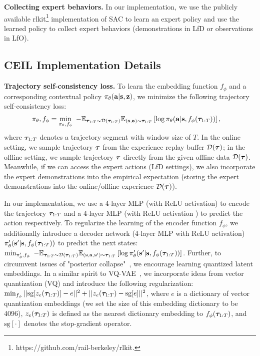 \textbf{Collecting expert behaviors.} In our implementation, we use the publicly available rlkit\footnote{https://github.com/rail-berkeley/rlkit.} implementation of SAC to learn an expert policy and use the learned policy to collect expert behaviors (demonstrations in LfD or observations in LfO). 







\subsection{CEIL Implementation Details}
\label{app:ceil_implementation_details}

\textbf{Trajectory self-consistency loss.} To learn the embedding function ${f_\phi}$ and a corresponding contextual policy $\pi_\theta(\mathbf{a}|\mathbf{s},{\mathbf{z}})$, we minimize the following trajectory self-consistency loss: 
\begin{align}
	\pi_\theta, f_\phi  &= \min_{\pi_\theta, f_\phi} \ - \mathbb{E}_{{\bm{\tau}}_{1:T}\sim\mathcal{D}({\bm{\tau}}_{1:T})}\mathbb{E}_{(\mathbf{s},\mathbf{a})\sim{\bm{\tau}}_{1:T}} \left[ \log \pi_\theta(\mathbf{a}|\mathbf{s}, {f_\phi}({\bm{\tau}}_{1:T})) \right], \nonumber 
\end{align} 
where ${\bm{\tau}}_{1:T}$ denotes a trajectory segment with window size of $T$. In the online setting, we sample trajectory ${\bm{\tau}}$ from the experience replay buffer $\mathcal{D}({\bm{\tau}})$; in the offline setting, we sample trajectory ${\bm{\tau}}$ directly from the given offline data $\mathcal{D}({\bm{\tau}})$. Meanwhile, if we can access the expert actions (\ie LfD settings), we also incorporate the expert demonstrations into the empirical expectation (\ie storing the expert demonstrations into the online/offline experience $\mathcal{D}({\bm{\tau}})$). 

In our implementation, we use a 4-layer MLP (with ReLU activation) to encode the trajectory ${\bm{\tau}}_{1:T}$ and a 4-layer MLP (with ReLU activation ) to predict the action respectively. To regularize the learning of the encoder function ${f_\phi}$, we additionally introduce a decoder network (4-layer MLP with ReLU activation) $\pi'_\theta(\mathbf{s}'|\mathbf{s}, {f_\phi}({\bm{\tau}}_{1:T}))$ to predict the next states: 
$\min_{\pi'_\theta, f_\phi} \ - \mathbb{E}_{{\bm{\tau}}_{1:T}\sim\mathcal{D}({\bm{\tau}}_{1:T})}\mathbb{E}_{(\mathbf{s},\mathbf{a},\mathbf{s}')\sim{\bm{\tau}}_{1:T}} \left[ \log \pi'_\theta(\mathbf{s}'|\mathbf{s}, {f_\phi}({\bm{\tau}}_{1:T})) \right]$. 
Further, to circumvent issues of "posterior collapse"~\citep{van2017neural}, we encourage learning quantized latent embeddings. In a similar spirit to VQ-VAE~\citep{van2017neural}, we incorporate ideas from vector quantization (VQ) and introduce the following regularization: 
$\min_{f_\phi}  ||\text{sg}[{z}_{e}({\bm{\tau}}_{1:T})] - {e}||^2 +  ||{z}_{e}({\bm{\tau}}_{1:T}) - \text{sg}[{e}]||^2 $, where ${e}$ is a dictionary of vector quantization embeddings (we set the size of this embedding dictionary to be 4096), ${z}_{e}({\bm{\tau}}_{1:T})$ is defined as the nearest dictionary embedding to  ${f_\phi}({\bm{\tau}}_{1:T})$, and $\text{sg}[\cdot]$ denotes the stop-gradient operator. 


